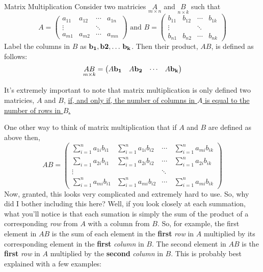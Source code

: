 \begin{defbox}{Matrix Multiplication}{}
    Consider two matricies $\underset{m \times n}{A}$ and $\underset{n \times k}{B}$ such that 
    \[
        A = \begin{pmatrix}
            a_{11} & a_{12} & \cdots & a_{1n} \\
            \vdots & & \ddots \\
            a_{m1} & a_{m2} & \cdots & a_{mn}
        \end{pmatrix} 
        \text{ and }
        B = \begin{pmatrix}
            b_{11} & b_{12} & \cdots & b_{1k} \\
            \vdots & & \ddots \\
            b_{n1} & b_{n2} & \cdots & b_{nk}
        \end{pmatrix} 
    \]
    Label the columns in $B$ as $\bf{b}_1, \bf{b}2, \dots\, \bf{b}_k$. Then their product, $AB$, is defined as follows:
    \[
        \underset{m \times k}{AB} = \begin{pmatrix}
            A\bf{b}_1 & A\bf{b}_2 & \cdots & A\bf{b}_k
        \end{pmatrix}
    \]
\end{defbox}

It's extremely important to note that matrix multiplication is only defined two matricies, $A$ and $B$, \underline{if, and only if, the number of columns in $A$ is equal to the number of rows in $B$.}

One other way to think of matrix multiplication that if $A$ and $B$ are defined as above then, 
\[
    AB = \begin{pmatrix}
        \sum_{i=1}^{n} a_{1i}b_{i1} & \sum_{i=1}^{n} a_{1i}b_{i2} & \cdots\, & \sum_{i=1}^{n} a_{mi}b_{ik} \\
        \sum_{i=1} a_{2i}b_{i1} & \sum_{i=1}^{n} a_{2i}b_{i2} & \cdots & \sum_{i=1}^{n} a_{2i}b_{ik}\\
        \vdots & & \ddots & \\ 
        \sum_{i=1}^{n} a_{mi}b_{i1} & \sum_{i=1}^{n} a_{mi}b_{i2} & \cdots & \sum_{i=1}^{n} a_{mi}b_{ik}
    \end{pmatrix}
\]
Now, granted, this looks very complicated and extremely hard to use. So, why did I bother including this here? Well, if you look closely at each summation, what you'll notice is that each sumation is simply the sum of the product of a corresponding \textit{row} from $A$ with a column from $B$. So, for example, the first element in $AB$ is the sum of each element in the \textbf{first} \textit{row} in $A$ multiplied by its corresponding element in the \textbf{first} \textit{column} in $B$. The second element in $AB$ is the \textbf{first} \textit{row} in $A$ multiplied by the \textbf{second} \textit{column} in $B$. This is probably best explained with a few examples:


